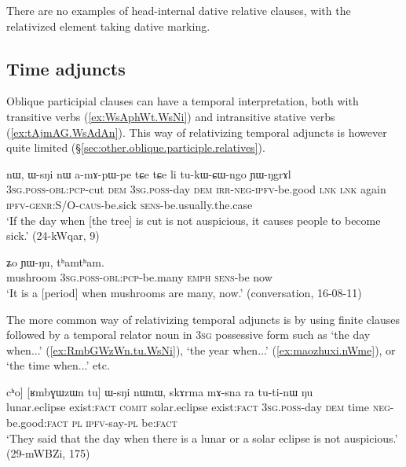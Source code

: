 There are no examples of head-internal dative relative clauses, with the relativized element taking dative marking.
 
\subsection{Time adjuncts} \label{sec:time.relativization}
Oblique participial clauses can have a temporal interpretation, both with transitive verbs (\ref{ex:WsAphWt.WsNi}) and intransitive stative verbs (\ref{ex:tAjmAG.WsAdAn}). This way of relativizing temporal adjuncts is however quite limited (§\ref{sec:other.oblique.participle.relatives}).

\begin{exe}
\ex \label{ex:WsAphWt.WsNi}
\gll [ɯ-sɤ-pʰɯt] nɯ, ɯ-sŋi nɯ a-mɤ-pɯ-pe tɕe tɕe li tu-kɯ-ɕɯ-ngo ɲɯ-ŋgrɤl \\
\textsc{3sg}.\textsc{poss}-\textsc{obl}:\textsc{pcp}-cut \textsc{dem} \textsc{3sg}.\textsc{poss}-day \textsc{dem} \textsc{irr}-\textsc{neg}-\textsc{ipfv}-be.good \textsc{lnk} \textsc{lnk} again \textsc{ipfv}-\textsc{genr}:S/O-\textsc{caus}-be.sick \textsc{sens}-be.usually.the.case \\
\glt `If the day when [the tree] is cut is not auspicious, it causes people to become sick.' (24-kWqar, 9)
\end{exe}

\begin{exe}
\ex \label{ex:tAjmAG.WsAdAn}
 ʑo ɲɯ-ŋu, tʰamtʰam. \\
mushroom \textsc{3sg}.\textsc{poss}-\textsc{obl}:\textsc{pcp}-be.many \textsc{emph} \textsc{sens}-be now \\
\glt `It is a [period] when mushrooms are many, now.' (conversation, 16-08-11)
\end{exe}

The more common way of relativizing temporal adjuncts is by using finite clauses followed by a temporal relator noun in \textsc{3sg} possessive form such as   `the day when...' (\ref{ex:RmbGWzWn.tu.WsNi}),  `the year when...' (\ref{ex:maozhuxi.nWme}), or  `the time when...' etc.  
 
\begin{exe}
\ex \label{ex:RmbGWzWn.tu.WsNi}
\gll [[slɤzɯn tu] cʰo] [ʁmbɣɯzɯn tu] ɯ-sŋi nɯnɯ, skɤrma mɤ-sna ra tu-ti-nɯ ŋu \\
lunar.eclipse exist:\textsc{fact} \textsc{comit} solar.eclipse exist:\textsc{fact} \textsc{3sg}.\textsc{poss}-day \textsc{dem} time \textsc{neg}-be.good:\textsc{fact} \textsc{pl} \textsc{ipfv}-say-\textsc{pl} be:\textsc{fact} \\
\glt `They said that the day when there is a lunar or a solar eclipse is not auspicious.' (29-mWBZi, 175)
\end{exe}

